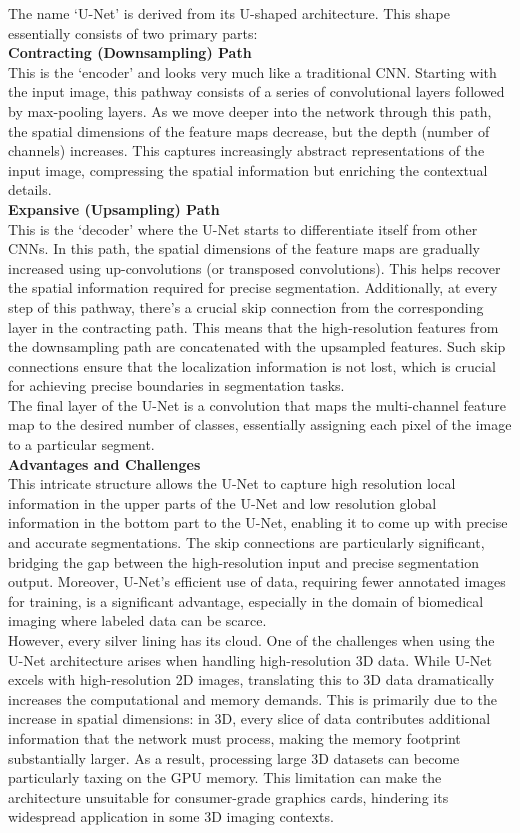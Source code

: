 \noindent The name `U-Net' is derived from its U-shaped architecture.
This shape essentially consists of two primary parts:\\[1ex]
\noindent\textbf{Contracting (Downsampling) Path}\\
This is the `encoder' and looks very much like a traditional CNN.
Starting with the input image, this pathway consists of a series of convolutional layers followed by max-pooling layers.
As we move deeper into the network through this path,
the spatial dimensions of the feature maps decrease, but the depth (number of channels) increases.
This captures increasingly abstract representations of the input image,
compressing the spatial information but enriching the contextual details.\\[1ex]
\noindent\textbf{Expansive (Upsampling) Path}\\
This is the `decoder' where the U-Net starts to differentiate itself from other CNNs.
In this path, the spatial dimensions of the feature maps are gradually increased using up-convolutions
(or transposed convolutions). This helps recover the spatial information required for precise segmentation.
Additionally, at every step of this pathway, there's a crucial skip connection from the corresponding layer in the contracting path.
This means that the high-resolution features from the downsampling path are concatenated with the upsampled features.
Such skip connections ensure that the localization information is not lost,
which is crucial for achieving precise boundaries in segmentation tasks.\cite[4]{ronneberger_u-net_2015}\\[1ex]
The final layer of the U-Net is a convolution that maps the multi-channel feature map to the desired number of classes, essentially assigning each pixel of the image to a particular segment.\\[1ex]
\textbf{Advantages and Challenges}\\
This intricate structure allows the U-Net to capture high resolution local information in the upper parts of the U-Net and low resolution global information in the bottom part to the U-Net,
enabling it to come up with precise and accurate segmentations. The skip connections are particularly significant, bridging the gap between the high-resolution input and precise segmentation output.
Moreover, U-Net's efficient use of data, requiring fewer annotated images for training, is a significant advantage, especially in the domain of biomedical imaging where labeled data can be scarce.\\
However, every silver lining has its cloud. One of the challenges when using the U-Net architecture arises when handling high-resolution 3D data. While U-Net excels with high-resolution 2D images,
translating this to 3D data dramatically increases the computational and memory demands. This is primarily due to the increase in spatial dimensions: in 3D,
every slice of data contributes additional information that the network must process, making the memory footprint substantially larger. As a result,
processing large 3D datasets can become particularly taxing on the GPU memory. This limitation can make the architecture unsuitable for consumer-grade graphics cards,
hindering its widespread application in some 3D imaging contexts.

